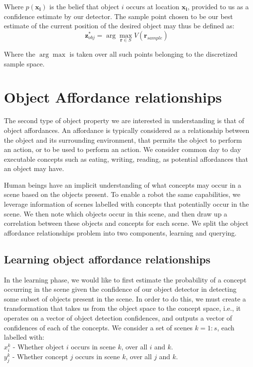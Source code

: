 Where $p(\mathbf{x_i})$ is the belief that object $i$ occurs at location $\mathbf{x_i}$, provided to us as a confidence estimate by our detector. The sample point chosen to be our best estimate of the current position of the desired object may thus be defined as: 
\begin{equation}
\mathbf{z}_{obj}^*= \arg\max_{\mathbf{r} \in S} V(\mathbf{r}_{sample})
\end{equation}



Where the $\arg\max$ is taken over all such points belonging to the discretized sample space. 

\section{Object Affordance relationships}
The second type of object property we are interested in understanding is that of object affordances. An affordance is typically considered as a relationship between the object and its surrounding environment, that permits the object to perform an action, or to be used to perform an action. We consider common day to day executable concepts such as eating, writing, reading, as potential affordances that an object may have. 

Human beings have an implicit understanding of what concepts may occur in a scene based on the objects present. To enable a robot the same capabilities, we leverage information of scenes labelled with concepts that potentially occur in the scene. We then note which objects occur in this scene, and then draw up a correlation between these objects and concepts for each scene. We split the object affordance relationships problem into two components, learning and querying.

\subsection{Learning object affordance relationships}
In the learning phase, we would like to first estimate the probability of a concept occurring in the scene given the confidence of our object detector in detecting some subset of objects present in the scene. In order to do this, we must create a transformation that takes us from the object space to the concept space, i.e., it operates on a vector of object detection confidences, and outputs a vector of confidences of each of the concepts. We consider a set of scenes $k = 1:s$, each labelled with:\\
$x_i^k$ - Whether object $i$ occurs in scene $k$, over all $i$ and $k$.\\
$y_j^k$ - Whether concept $j$ occurs in scene $k$, over all $j$ and $k$.\\
 

